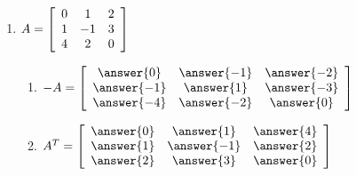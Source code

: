 \documentclass{ximera}
\begin{document}
\begin{exercise}
\begin{enumerate}
\item
    $A = \startmat{ccc}
      0 & 1 & 2 \\
      1 & -1 & 3 \\
      4 & 2 & 0
    \stopmat$

    \begin{enumerate}
      \item $-A = 
      \startmat{ccc}
      \answer{0} & \answer{-1} & \answer{-2} \\
      \answer{-1} & \answer{1} & \answer{-3} \\
      \answer{-4} & \answer{-2} & \answer{0}
      \stopmat$

      \item $A^T =
      \startmat{ccc}
      \answer{0} & \answer{1} & \answer{4} \\
      \answer{1} & \answer{-1} & \answer{2} \\
      \answer{2} & \answer{3} & \answer{0}
      \stopmat$
    \end{enumerate}

  \end{enumerate}
\end{exercise}
\end{document}
